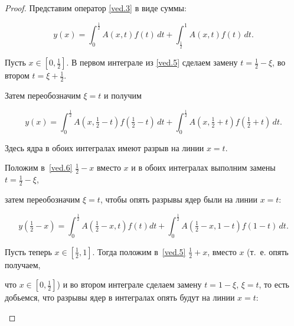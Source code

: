 \smallskip



\begin{proof} Представим оператор \eqref{ved.3} в виде суммы:

\begin{equation}

\label{ved.5}

y(x)=\int _{0}^{\frac12} {A(x,t)f(t)\,dt}+ \int _{\frac12}^{1}{A(x,t)f(t)\,dt}.

\end{equation}

Пусть $x\in[0,\frac12]$. В первом интеграле из \eqref{ved.5} сделаем замену $t=\frac12-\xi$, во втором $t=\xi+\frac12$. 

Затем переобозначим  $\xi=t$ и получим

\begin{equation}

\label{ved.6}

y(x)=

\int _{0}^{\frac12} A(x,\tfrac12-t) f(\tfrac12-t)\,dt+ 

\int _{0}^{\frac12} A(x,\tfrac12+t) f(\tfrac12+t)\,dt.

\end{equation}

Здесь ядра в обоих интегралах имеют разрыв на линии $x=t$. 

Положим в~\eqref{ved.6} $\frac12-x$  вместо $x$ и в обоих интегралах выполним  замены $t=\frac12-\xi$, 

затем переобозначим $\xi=t$, чтобы опять разрывы ядер были на линии $x=t$:

\begin{equation} 

\label{ved.9}

y(\tfrac12-x)=

\int _{0}^{\frac12}A(\tfrac12-x,t)  f(t)dt+

\int _{0}^{\frac12}A(\tfrac12-x,1-t)f(1-t)\,dt.

\end{equation}



Пусть теперь $x\in[\frac12,1]$. Тогда положим в~\eqref{ved.5} $\frac12+x$, вместо $x$ (т.~е. опять получаем, 

что $x\in[0,\frac12]$) и во втором интеграле сделаем замену  $t=1-\xi$, $\xi=t$, то есть добьемся, что разрывы ядер в интегралах опять  будут на линии $x=t$:

\begin{equation}


\end{equation}
\end{proof}
